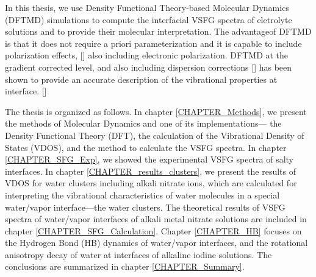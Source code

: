 In this thesis, we use Density Functional Theory-based Molecular Dynamics (DFTMD) simulations to compute 
the interfacial VSFG spectra of eletrolyte solutions and to provide their molecular interpretation.
The advantageof DFTMD is that it does not require a priori parameterization and it is capable to include polarization effects, [\cite{Ufimtsev2011}]
also including electronic polarization. DFTMD at the gradient corrected level, and also including dispersion corrections [\cite{Grimme04,Grimme06,Grimme07,Grimme10,Baer2011}] 
has been shown to provide an accurate description of the vibrational properties at interface. [\cite{Fornaro2015}]

The thesis is organized as follows. 
In chapter \ref{CHAPTER_Methods}, we present the methods of \abinitio Molecular Dynamics and one of its implementations--- 
the Density Functional Theory (DFT), the calculation of the Vibrational Density of States (VDOS), and the method to calculate the VSFG spectra.
In chapter \ref{CHAPTER_SFG_Exp}, we showed the experimental VSFG spectra of salty interfaces.
In chapter \ref{CHAPTER_results_clusters}, we present the results of VDOS for water clusters including alkali nitrate ions, 
 which are calculated for interpreting the vibrational characteristics of water molecules in a special water/vapor interface---the water clusters.
The theoretical results of VSFG spectra of water/vapor interfaces of alkali metal nitrate solutions are included in chapter \ref{CHAPTER_SFG_Calculation}. 
Chapter \ref{CHAPTER_HB} focuses on the Hydrogen Bond (HB) dynamics of water/vapor interfaces, 
and the rotational anisotropy decay of water at interfaces of alkaline iodine solutions. 
The conclusions are summarized in chapter \ref{CHAPTER_Summary}.
